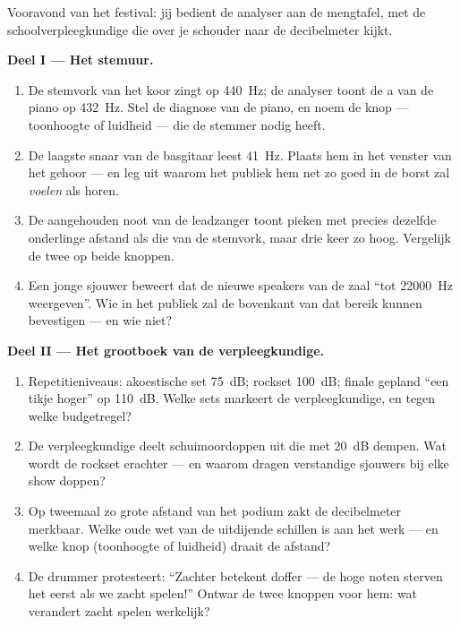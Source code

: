 \begin{problem}\label{pb:g8:sound-pitch-loudness:1}
Vooravond van het festival: jij bedient de analyser aan de mengtafel,
met de schoolverpleegkundige die over je schouder naar de decibelmeter
kijkt.

\medskip\noindent\textbf{Deel I --- Het stemuur.}
\begin{enumerate}
  \item De stemvork van het koor zingt op \qty{440}{Hz}; de analyser
        toont de a van de piano op \qty{432}{Hz}. Stel de diagnose van
        de piano, en noem de knop --- toonhoogte of luidheid --- die de
        stemmer nodig heeft.
  \item De laagste snaar van de basgitaar leest \qty{41}{Hz}. Plaats
        hem in het venster van het gehoor --- en leg uit waarom het
        publiek hem net zo goed in de borst zal \emph{voelen} als
        horen.
  \item De aangehouden noot van de leadzanger toont pieken met precies
        dezelfde onderlinge afstand als die van de stemvork, maar drie
        keer zo hoog. Vergelijk de twee  op beide
        knoppen.
  \item Een jonge sjouwer beweert dat de nieuwe speakers van de zaal
        ``tot \qty{22000}{Hz} weergeven''. Wie in het publiek zal de
        bovenkant van dat bereik kunnen bevestigen --- en wie niet?
\end{enumerate}

\medskip\noindent\textbf{Deel II --- Het grootboek van de
verpleegkundige.}
\begin{enumerate}[resume]
  \item Repetitieniveaus: akoestische set \qty{75}{dB}; rockset
        \qty{100}{dB}; finale gepland ``een tikje hoger'' op
        \qty{110}{dB}. Welke sets markeert de verpleegkundige, en tegen
        welke budgetregel?
  \item De verpleegkundige deelt schuimoordoppen uit die
         met \qty{20}{dB} dempen. Wat wordt de rockset
        erachter --- en waarom dragen verstandige sjouwers bij elke
        show doppen?
  \item Op tweemaal zo grote afstand van het podium zakt de decibelmeter
        merkbaar. Welke oude wet van de uitdijende schillen is aan het
        werk --- en welke knop (toonhoogte of luidheid) draait de
        afstand?
  \item De drummer protesteert: ``Zachter betekent doffer --- de hoge
        noten sterven het eerst als we zacht spelen!'' Ontwar de twee
        knoppen voor hem: wat verandert zacht spelen werkelijk?
\end{enumerate}


\end{problem}
